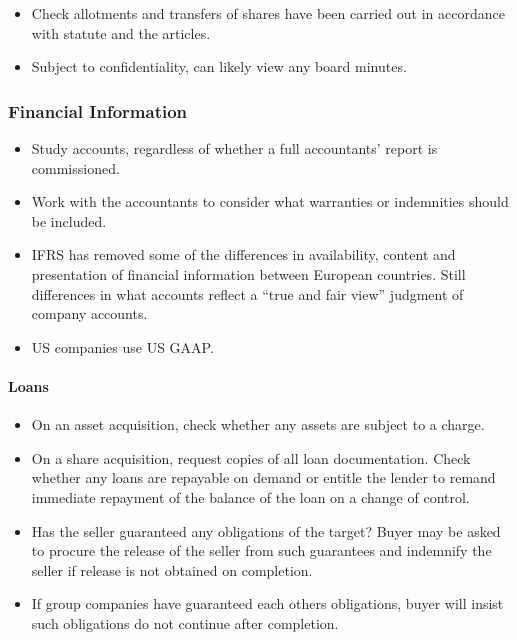 \documentclass[
]{article}
\providecommand{\tightlist}{%
  \setlength{\itemsep}{0pt}\setlength{\parskip}{0pt}}
\begin{document}
\begin{itemize}
\tightlist
\item
  Check allotments and transfers of shares have been carried out in
  accordance with statute and the articles.
\item
  Subject to confidentiality, can likely view any board minutes.
\end{itemize}

\hypertarget{financial-information}{%
\subsubsection{Financial Information}\label{financial-information}}

\begin{itemize}
\tightlist
\item
  Study accounts, regardless of whether a full accountants' report is
  commissioned.
\item
  Work with the accountants to consider what warranties or indemnities
  should be included.
\item
  IFRS has removed some of the differences in availability, content and
  presentation of financial information between European countries.
  Still differences in what accounts reflect a ``true and fair view''
  judgment of company accounts.
\item
  US companies use US GAAP.
\end{itemize}

\hypertarget{loans}{%
\paragraph{Loans}\label{loans}}

\begin{itemize}
\tightlist
\item
  On an asset acquisition, check whether any assets are subject to a
  charge.
\item
  On a share acquisition, request copies of all loan documentation.
  Check whether any loans are repayable on demand or entitle the lender
  to remand immediate repayment of the balance of the loan on a change
  of control.
\item
  Has the seller guaranteed any obligations of the target? Buyer may be
  asked to procure the release of the seller from such guarantees and
  indemnify the seller if release is not obtained on completion.
\item
  If group companies have guaranteed each others obligations, buyer will
  insist such obligations do not continue after completion.
\end{itemize}
\end{document}
